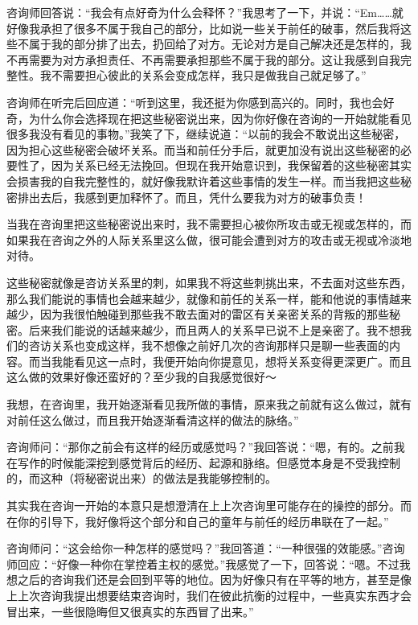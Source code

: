 咨询师回答说：“我会有点好奇为什么会释怀？”我思考了一下，并说：“Em……就好像我承担了很多不属于我自己的部分，比如说一些关于前任的破事，然后我将这些不属于我的部分排了出去，扔回给了对方。无论对方是自己解决还是怎样的，我不再需要为对方承担责任、不再需要承担那些不属于我的部分。这让我感到自我完整性。我不需要担心彼此的关系会变成怎样，我只是做我自己就足够了。”

咨询师在听完后回应道：“听到这里，我还挺为你感到高兴的。同时，我也会好奇，为什么你会选择现在把这些秘密说出来，因为你好像在咨询的一开始就能看见很多我没有看见的事物。”我笑了下，继续说道：“以前的我会不敢说出这些秘密，因为担心这些秘密会破坏关系。而当和前任分手后，就更加没有说出这些秘密的必要性了，因为关系已经无法挽回。但现在我开始意识到，我保留着的这些秘密其实会损害我的自我完整性的，就好像我默许着这些事情的发生一样。而当我把这些秘密排出去后，我感到更加释怀了。而且，凭什么要我为对方的破事负责！

当我在咨询里把这些秘密说出来时，我不需要担心被你所攻击或无视或怎样的，而如果我在咨询之外的人际关系里这么做，很可能会遭到对方的攻击或无视或冷淡地对待。

这些秘密就像是咨访关系里的刺，如果我不将这些刺挑出来，不去面对这些东西，那么我们能说的事情也会越来越少，就像和前任的关系一样，能和他说的事情越来越少，因为我很怕触碰到那些我不敢去面对的雷区\pozhehao{}有关亲密关系的背叛的那些秘密。后来我们能说的话越来越少，而且两人的关系早已说不上是亲密了。我不想我们的咨访关系也变成这样，我不想像之前好几次的咨询那样只是聊一些表面的内容。而当我能看见这一点时，我便开始向你提意见，想将关系变得更深更广。而且这么做的效果好像还蛮好的？至少我的自我感觉很好～

我想，在咨询里，我开始逐渐看见我所做的事情，原来我之前就有这么做过，就有对前任这么做过，而且我开始逐渐看清这样的做法的脉络。”

咨询师问：“那你之前会有这样的经历或感觉吗？”我回答说：“嗯，有的。之前我在写作的时候能深挖到感觉背后的经历、起源和脉络。但感觉本身是不受我控制的，而这种（将秘密说出来）的做法是我能够控制的。

其实我在咨询一开始的本意只是想澄清在上上次咨询里可能存在的操控的部分。而在你的引导下，我好像将这个部分和自己的童年与前任的经历串联在了一起。”

咨询师问：“这会给你一种怎样的感觉吗？”我回答道：“一种很强的效能感。”咨询师回应：“好像一种你在掌控着主权的感觉。”我感觉了一下，回答说：“嗯。不过我想之后的咨询我们还是会回到平等的地位。因为好像只有在平等的地方，甚至是像上上次咨询我提出想要结束咨询时，我们在彼此抗衡的过程中，一些真实东西才会冒出来，一些很隐晦但又很真实的东西冒了出来。”

